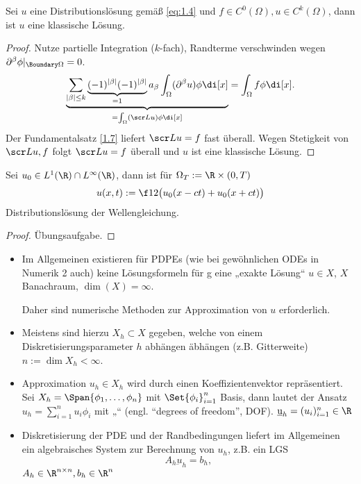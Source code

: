 \begin{st} \label{1.28}
	Sei $u$ eine Distributionslösung gemäß \eqref{eq:1.4} und $f \in C^0(\Omega), u \in C^k(\Omega)$, dann ist $u$ eine klassische Lösung.
	\begin{proof}
		Nutze partielle Integration ($k$-fach), Randterme verschwinden wegen $\partial^\beta \phi |_{\Boundary \Omega} = 0$.
		\[
			\underbrace{\sum_{|\beta|\le k} \underbrace{(-1)^{|\beta|} (-1)^{|\beta|}}_{=1} a_\beta \int_\Omega (\partial^\beta u) \phi \di[x]}_{= \int_\Omega (\scr L u) \phi \di[x]}
			= \int_\Omega f \phi \di[x].
		\]
		Der Fundamentalsatz \ref{1.7} liefert $\scr L u = f$ fast überall.
		Wegen Stetigkeit von $\scr L u, f$ folgt $\scr L u = f$ überall und $u$ ist eine klassische Lösung.
	\end{proof}
\end{st}

\begin{st} \label{1.29}
	Sei $u_0 \in L^1(\R) \cap L^\infty(\R)$, dann ist für $\Omega_T := \R \times (0,T)$
	\[
		u(x,t) := \f 12 \big( u_0(x-ct) + u_0(x+ct) \big)
	\]
	Distributionslösung der Wellengleichung.
	\begin{proof}
		Übungsaufgabe.
	\end{proof}
\end{st}

\begin{nt*}
	\begin{itemize}
		\item
			Im Allgemeinen existieren für PDPEs (wie bei gewöhnlichen ODEs in Numerik 2 auch) keine Lösungsformeln für g eine „exakte Lösung“ $u \in X$, $X$ Banachraum, $\dim(X) = \infty$.

			Daher sind numerische Methoden zur Approximation von $u$ erforderlich.
		\item
			Meistens sind hierzu  $X_h \subset X$ gegeben, welche von einem Diskretisierungsparameter $h$ abhängen äbhängen (z.B. Gitterweite) $n := \dim X_h < \infty$.
		\item
			Approximation $u_h \in X_h$ wird durch einen Koeffizientenvektor repräsentiert.
			Sei $X_h = \Span{\phi_1, \dotsc, \phi_n}$ mit $\Set{\phi_i}_{i=1}^n$ Basis, dann lautet der Ansatz $u_h = \sum_{i=1}^n u_i \phi_i$ mit „“ (engl. “degrees of freedom”, DOF).
			$\underbar{u}_h = (u_i)_{i=1}^n \in \R$
		\item
			Diskretisierung der PDE und der Randbedingungen liefert im Allgemeinen ein algebraisches System zur Berechnung von $u_h$, z.B. ein LGS
			\[
				A_h \underbar{u}_h = b_h,
			\]
			$A_h \in \R^{n\times n}, b_h \in \R^n$
	\end{itemize}
\end{nt*}

